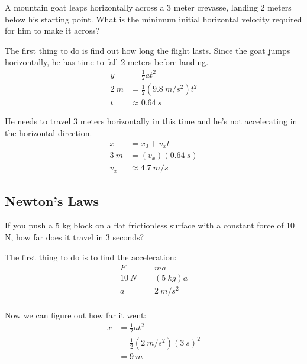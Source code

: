 \documentclass[fleqn,addpoints]{exam}
\begin{document}
\begin{questions}
\begin{solution}
\end{solution}
\bonusquestion[5]
A mountain goat leaps horizontally across a 3 meter crevasse, landing 2 meters below his starting point.  What is the
minimum initial horizontal velocity required for him to make it across?

\begin{solution}
The first thing to do is find out how long the flight lasts.  Since the goat jumps horizontally, he has time to fall 2
meters before landing.  
\begin{align*}
  y &= \frac{1}{2} at^2 \\
  2 \ m &= \frac{1}{2} (9.8 \ m/s^2)t^2 \\
  t &\approx 0.64 \ s
\end{align*}

He needs to travel 3 meters horizontally in this time and he's not accelerating in the horizontal direction.
\begin{align*}
  x &= x_0 + v_xt \\
  3 \ m &= (v_x)(0.64 \ s) \\
  v_x &\approx 4.7 \ m/s
\end{align*}

\end{solution}

\subsection{Newton's Laws}


\question[5]
If you push a 5 kg block on a flat frictionless surface with a constant force of 10 N, how far does it travel in 
3 seconds?

\begin{solution}
The first thing to do is to find the acceleration:
\begin{align*}
  F &= ma \\
  10 \ N &= (5 \ kg) a \\
  a &= 2 \ m/s^2 \\
\end{align*}

Now we can figure out how far it went:
\begin{align*}
  x &= \frac{1}{2} at^2 \\
    &= \frac{1}{2} (2 \ m/s^2)(3 \ s)^2 \\
    &= 9 \ m \\
\end{align*}


\end{solution}
\end{questions}
\end{document}
